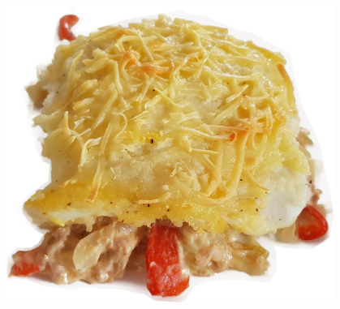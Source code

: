 \vspace*{2cm}
\begin{center}
\includegraphics[width=0.8\textwidth]{fotos/molde_atun_1.jpeg}
\end{center}


